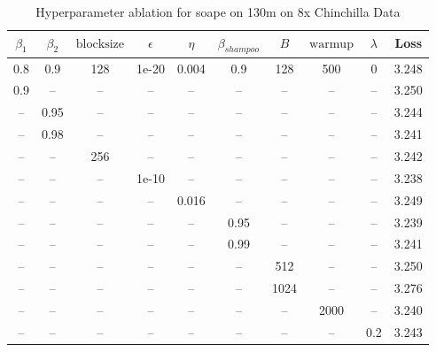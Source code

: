 \begin{table}[h!]
\centering
\caption{Hyperparameter ablation for soape on 130m on 8x Chinchilla Data}
\label{tab:ablation_soape_130m_on_8x_chinchilla_data}
\begin{tabular}{cccccccccc}
\toprule
$\beta_1$ & $\beta_2$ & $\mathrm{block size}$ & $\epsilon$ & $\eta$ & $\beta_{shampoo}$ & $B$ & $\mathrm{warmup}$ & $\lambda$ & Loss \\
\midrule
0.8 & 0.9 & 128 & 1e-20 & 0.004 & 0.9 & 128 & 500 & 0 & 3.248 \\
\midrule
0.9 & -- & -- & -- & -- & -- & -- & -- & -- & 3.250 \\
-- & 0.95 & -- & -- & -- & -- & -- & -- & -- & 3.244 \\
-- & 0.98 & -- & -- & -- & -- & -- & -- & -- & 3.241 \\
-- & -- & 256 & -- & -- & -- & -- & -- & -- & 3.242 \\
-- & -- & -- & 1e-10 & -- & -- & -- & -- & -- & 3.238 \\
-- & -- & -- & -- & 0.016 & -- & -- & -- & -- & 3.249 \\
-- & -- & -- & -- & -- & 0.95 & -- & -- & -- & 3.239 \\
-- & -- & -- & -- & -- & 0.99 & -- & -- & -- & 3.241 \\
-- & -- & -- & -- & -- & -- & 512 & -- & -- & 3.250 \\
-- & -- & -- & -- & -- & -- & 1024 & -- & -- & 3.276 \\
-- & -- & -- & -- & -- & -- & -- & 2000 & -- & 3.240 \\
-- & -- & -- & -- & -- & -- & -- & -- & 0.2 & 3.243 \\
\bottomrule
\end{tabular}
\end{table}

